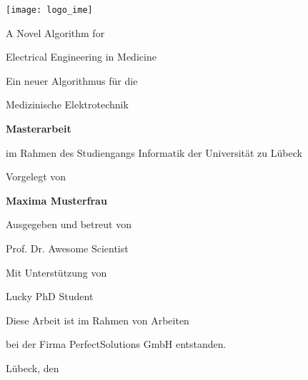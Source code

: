 \begin{titlepage}

  \texttt{[image: logo\_ime]}

  \vspace{0.8cm}


    \LARGE
    A Novel Algorithm for
    
    Electrical Engineering in Medicine

    \vspace{1cm}

    \Large

    Ein neuer Algorithmus für die
    
    Medizinische Elektrotechnik

    \vspace{0.8cm}

    \large

    \textbf{Masterarbeit} 

    im Rahmen des Studiengangs Informatik der Universität zu Lübeck

    \vspace{0.8cm}
    
    Vorgelegt von

    \textbf{Maxima Musterfrau}

    \vspace{0.8cm}

    Ausgegeben und betreut von

    Prof. Dr. Awesome Scientist

    \vspace{0.8cm}

    Mit Unterstützung von

    Lucky PhD Student

    \vspace{0.8cm}

    Diese Arbeit ist im Rahmen von Arbeiten 

    bei der Firma PerfectSolutions GmbH entstanden.
    
    \vspace{1.3cm}

    Lübeck, den \submitdate


\end{titlepage}

